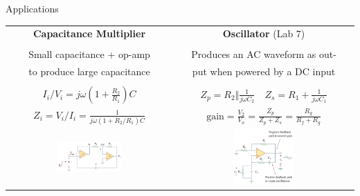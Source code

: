 \documentclass{beamer}
\begin{document}
\begin{frame}{Applications}

\begin{table}[]
    \centering
    \begin{tabular}{c|c}
        \textbf{Capacitance Multiplier}& \textbf{Oscillator} (Lab 7)  \\
        &\\
        Small capacitance + op-amp &  Produces an AC waveform as out-
          \\
         to produce large capacitance & put when powered by a DC input\\
         &\\
         ${I}_i/{V_i} = j\omega(1+\frac{R_2}{R_1})C$ &  ${Z}_p=R_2 \Vert \frac{1}{j\omega C_2} \quad Z_s = R_1 + \frac{1}{j\omega C_1}$\\

         ${Z}_i = {V}_i/{I}_i = \frac{1}{j\omega(1+R_2/R_1)C}$& $\text{gain} = \frac{V_2}{V_o} = \frac{Z_p}{Z_p+Z_s}=\frac{R_g}{R_f+R_g}$\\
        \includegraphics[width=0.4\textwidth]{img_ch10/3_capacitance multiplier.png}
         &
        \includegraphics[width=0.35\textwidth]{img_ch10/4_oscillator.png}
         \\
    \end{tabular}
\end{table}

    
\end{frame}

\end{document}
